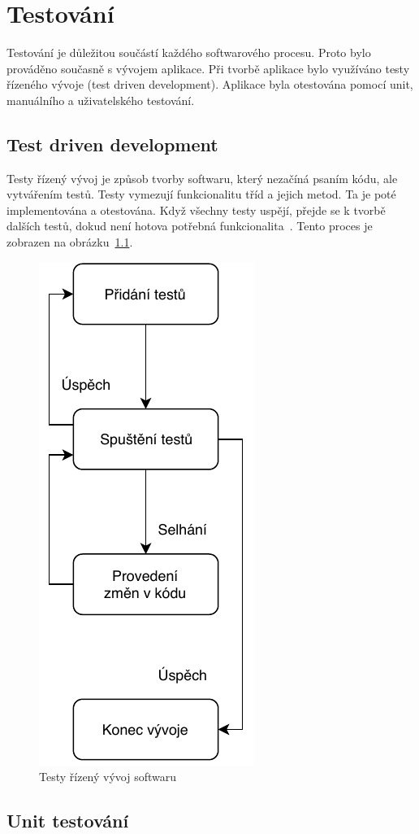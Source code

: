 \documentclass[thesis=B,czech]{FITthesis}[2012/10/20]
\begin{document}
\chapter{Testování}

Testování je důležitou součástí každého softwarového procesu. Proto bylo prováděno současně s vývojem aplikace. Při tvorbě aplikace bylo využíváno testy řízeného vývoje (test driven development). Aplikace byla otestována pomocí unit, manuálního a uživatelského testování.

\section{Test driven development}

Testy řízený vývoj je způsob tvorby softwaru, který nezačíná psaním kódu, ale vytvářením testů. Testy vymezují funkcionalitu tříd a jejich metod. Ta je poté implementována a otestována. Když všechny testy uspějí, přejde se k tvorbě dalších testů, dokud není hotova potřebná funkcionalita~\cite{tdd}. Tento proces je zobrazen na obrázku~\ref{fig:tdd}.

\begin{figure}\centering
	\includegraphics[width=.4\textwidth]{diagrams/TDD}
	\caption{Testy řízený vývoj softwaru}\label{fig:tdd}
\end{figure}

\section{Unit testování}
\end{document}
